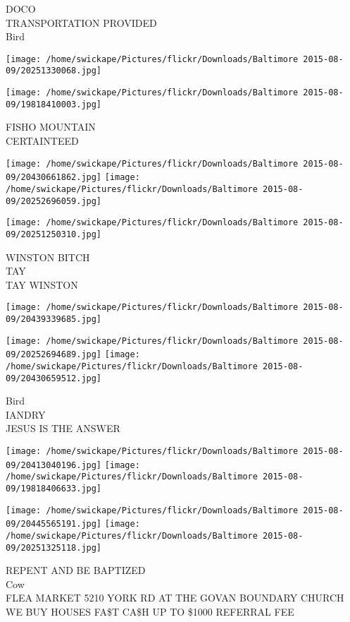 \documentclass[10pt,letterpaper]{article}
\begin{document}
DOCO\\
TRANSPORTATION PROVIDED\\
Bird\\
\pagebreak

\texttt{[image: /home/swickape/Pictures/flickr/Downloads/Baltimore 2015-08-09/20251330068.jpg]}

\vspace{0.25in}
\texttt{[image: /home/swickape/Pictures/flickr/Downloads/Baltimore 2015-08-09/19818410003.jpg]}

FISHO MOUNTAIN\\
CERTAINTEED\\
\pagebreak

\texttt{[image: /home/swickape/Pictures/flickr/Downloads/Baltimore 2015-08-09/20430661862.jpg]}
\texttt{[image: /home/swickape/Pictures/flickr/Downloads/Baltimore 2015-08-09/20252696059.jpg]}

\texttt{[image: /home/swickape/Pictures/flickr/Downloads/Baltimore 2015-08-09/20251250310.jpg]}

WINSTON BITCH\\
TAY\\
TAY WINSTON\\
\pagebreak

\texttt{[image: /home/swickape/Pictures/flickr/Downloads/Baltimore 2015-08-09/20439339685.jpg]}

\vspace{0.25in}
\texttt{[image: /home/swickape/Pictures/flickr/Downloads/Baltimore 2015-08-09/20252694689.jpg]}
\texttt{[image: /home/swickape/Pictures/flickr/Downloads/Baltimore 2015-08-09/20430659512.jpg]}

Bird\\
IANDRY\\
JESUS IS THE ANSWER\\
\pagebreak

\texttt{[image: /home/swickape/Pictures/flickr/Downloads/Baltimore 2015-08-09/20413040196.jpg]}
\texttt{[image: /home/swickape/Pictures/flickr/Downloads/Baltimore 2015-08-09/19818406633.jpg]}

\texttt{[image: /home/swickape/Pictures/flickr/Downloads/Baltimore 2015-08-09/20445565191.jpg]}
\texttt{[image: /home/swickape/Pictures/flickr/Downloads/Baltimore 2015-08-09/20251325118.jpg]}

REPENT AND BE BAPTIZED\\
Cow\\
FLEA MARKET 5210 YORK RD AT THE GOVAN BOUNDARY CHURCH\\
WE BUY HOUSES FA\$T CA\$H UP TO \$1000 REFERRAL FEE\\
\pagebreak
\end{document}
